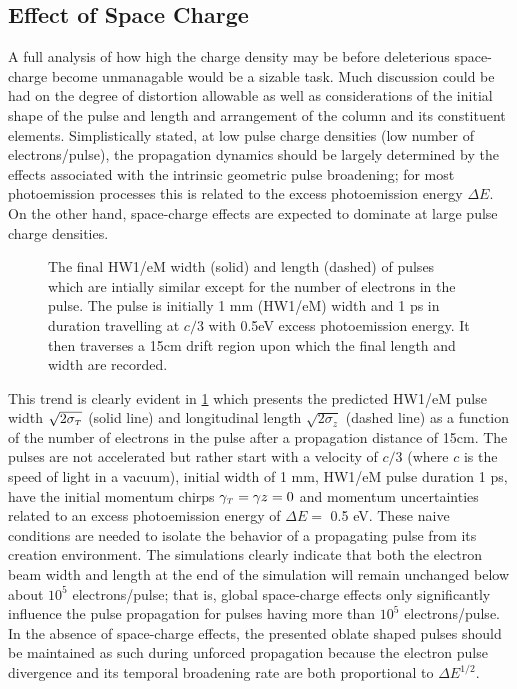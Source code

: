 \subsection{Effect of Space Charge} \label{sec:free_spacecharge}

A full analysis of how high the charge density may be before deleterious space-charge become unmanagable would be a sizable task.
Much discussion could be had on the degree of distortion allowable as well as considerations of the initial shape of the pulse and length and arrangement of the column and its constituent elements.
Simplistically stated, at low pulse charge densities (low number of electrons/pulse), the propagation dynamics should be largely determined by the effects associated with the intrinsic geometric pulse broadening; for most photoemission processes this is related to the excess photoemission energy $\Delta E$.
On the other hand, space-charge effects are expected to dominate at large pulse charge densities.

\begin{figure}
  \centering
  \begin{tikzpicture}
    
  \end{tikzpicture}
  \caption[Simplistic free-space pulse evolution vs charge density]{
    The final HW1/eM width (solid) and length (dashed) of pulses which are intially similar except for the number of electrons in the pulse.
    The pulse is initially 1 mm (HW1/eM) width and 1 ps in duration travelling at $c/3$ with 0.5eV excess photoemission energy.
    It then traverses a 15cm drift region upon which the final length and width are recorded.
  }
  \label{fig:spacecharge_noacc}
\end{figure}

This trend is clearly evident in \ref{fig:spacecharge_noacc} which presents the predicted HW1/eM pulse width $\sqrt{2 \sigma_{\smallT}}$ (solid line) and longitudinal length $\sqrt{2 \sigma_{z}}$ (dashed line) as a function of the number of electrons in the pulse after a propagation distance of 15cm.
The pulses are not accelerated but rather start with a velocity of $c/3$ (where $c$ is the speed of light in a vacuum), initial width of 1 mm, HW1/eM pulse duration 1 ps, have the initial momentum chirps $\gamma_{\smallT} = \gamma{z} = 0 $ and momentum uncertainties related to an excess photoemission energy of $\Delta E = $ 0.5 eV.
These naive conditions are needed to isolate the behavior of a propagating pulse from its creation environment.
The simulations clearly indicate that both the electron beam width and length at the end of the simulation will remain unchanged below about $10^5$ electrons/pulse; that is, global space-charge effects only significantly influence the pulse propagation for pulses having more than $10^5$ electrons/pulse.
In the absence of space-charge effects, the presented oblate shaped pulses should be maintained as such during unforced propagation because the electron pulse divergence and its temporal broadening rate are both proportional to $\Delta E^{1/2}$.

